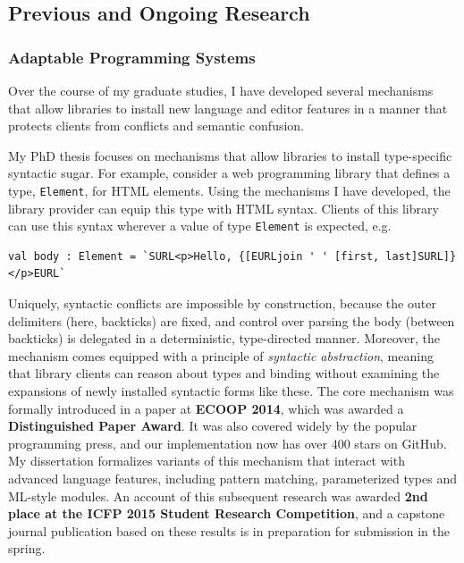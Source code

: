 \documentclass[10pt]{article}
\let\li\lstinline
\begin{document}


\subsection*{Previous and Ongoing Research}
\subsubsection*{Adaptable Programming Systems}

Over the course of my graduate studies, I have developed several mechanisms that allow libraries to install new language and editor features in a manner that protects clients from conflicts and semantic confusion.

My PhD thesis focuses on mechanisms that allow libraries to install type-specific syntactic sugar. For example, consider a web programming library that defines a type, \li{Element}, for HTML elements. Using the mechanisms I have developed, the library provider can equip this type with HTML syntax. Clients of this library can use this syntax wherever a value of type \li{Element} is expected, e.g.
\begin{lstlisting}[numbers=none]
val body : Element = `SURL<p>Hello, {[EURLjoin ' ' [first, last]SURL]}</p>EURL`
\end{lstlisting}
Uniquely, syntactic conflicts are impossible by construction, because the outer delimiters (here, backticks) are fixed, and control over parsing the body (between backticks) is delegated in a deterministic, type-directed manner. Moreover, the mechanism comes equipped with a principle of \emph{syntactic abstraction}, meaning that library clients can reason about types and binding without examining the expansions of newly installed syntactic forms like these. The core mechanism was formally introduced in a paper at \textbf{ECOOP 2014}, which was awarded a \textbf{Distinguished Paper Award}. It was  also covered widely by the popular programming press, and our implementation now has over 400 stars on GitHub.
My dissertation formalizes variants of this mechanism that interact with advanced language features, including pattern matching, parameterized types and ML-style modules. An account of this subsequent research was awarded \textbf{2nd place at the ICFP 2015 Student Research Competition}, and a capstone journal publication based on these results is in preparation for submission in the spring.
\end{document}
